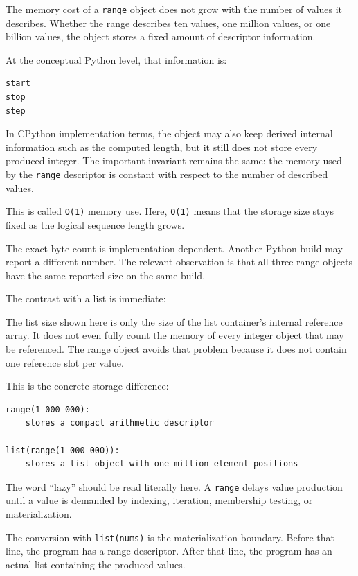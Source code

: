 The memory cost of a \texttt{range} object does not grow with the number of values it describes. Whether the range describes ten values, one million values, or one billion values, the object stores a fixed amount of descriptor information.

At the conceptual Python level, that information is:

\begin{verbatim}
start
stop
step
\end{verbatim}

In CPython implementation terms, the object may also keep derived internal information such as the computed length, but it still does not store every produced integer. The important invariant remains the same: the memory used by the \texttt{range} descriptor is constant with respect to the number of described values.

This is called \texttt{O(1)} memory use. Here, \texttt{O(1)} means that the storage size stays fixed as the logical sequence length grows.

The exact byte count is implementation-dependent. Another Python build may report a different number. The relevant observation is that all three range objects have the same reported size on the same build.

The contrast with a list is immediate:

The list size shown here is only the size of the list container's internal reference array. It does not even fully count the memory of every integer object that may be referenced. The range object avoids that problem because it does not contain one reference slot per value.

This is the concrete storage difference:

\begin{verbatim}
range(1_000_000):
    stores a compact arithmetic descriptor

list(range(1_000_000)):
    stores a list object with one million element positions
\end{verbatim}

The word \enquote{lazy} should be read literally here. A \texttt{range} delays value production until a value is demanded by indexing, iteration, membership testing, or materialization.

The conversion with \texttt{list(nums)} is the materialization boundary. Before that line, the program has a range descriptor. After that line, the program has an actual list containing the produced values.

